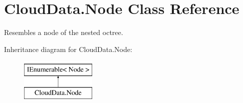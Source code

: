 \hypertarget{class_cloud_data_1_1_node}{}\section{Cloud\+Data.\+Node Class Reference}
\label{class_cloud_data_1_1_node}


Resembles a node of the nested octree.  


Inheritance diagram for Cloud\+Data.\+Node\+:\begin{figure}[H]
\begin{center}
\leavevmode
\includegraphics[height=2.000000cm]{class_cloud_data_1_1_node}
\end{center}
\end{figure}
